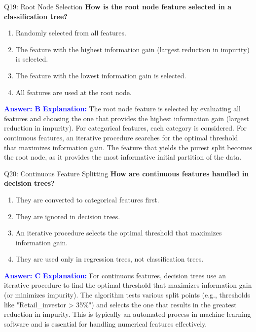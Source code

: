 \documentclass[8pt]{beamer}
\begin{document}
	\begin{frame}{Q19: Root Node Selection}
		\fontsize{6.5}{7.5}\selectfont
		\textbf{How is the root node feature selected in a classification tree?}
		\begin{enumerate}
			\item Randomly selected from all features.
			\item The feature with the highest information gain (largest reduction in impurity) is selected.
			\item The feature with the lowest information gain is selected.
			\item All features are used at the root node.
		\end{enumerate}
		\vspace{0.1cm}
		\textcolor{blue}{\textbf{Answer: B}}
		\vspace{0.1cm}
		\textcolor{blue}{\textbf{Explanation:}} The root node feature is selected by evaluating all features and choosing the one that provides the highest information gain (largest reduction in impurity). For categorical features, each category is considered. For continuous features, an iterative procedure searches for the optimal threshold that maximizes information gain. The feature that yields the purest split becomes the root node, as it provides the most informative initial partition of the data.
	\end{frame}
	
	\begin{frame}{Q20: Continuous Feature Splitting}
		\fontsize{6.5}{7.5}\selectfont
		\textbf{How are continuous features handled in decision trees?}
		\begin{enumerate}
			\item They are converted to categorical features first.
			\item They are ignored in decision trees.
			\item An iterative procedure selects the optimal threshold that maximizes information gain.
			\item They are used only in regression trees, not classification trees.
		\end{enumerate}
		\vspace{0.1cm}
		\textcolor{blue}{\textbf{Answer: C}}
		\vspace{0.1cm}
		\textcolor{blue}{\textbf{Explanation:}} For continuous features, decision trees use an iterative procedure to find the optimal threshold that maximizes information gain (or minimizes impurity). The algorithm tests various split points (e.g., thresholds like "Retail\_investor > 35\%") and selects the one that results in the greatest reduction in impurity. This is typically an automated process in machine learning software and is essential for handling numerical features effectively.
	\end{frame}
	
\end{document}
